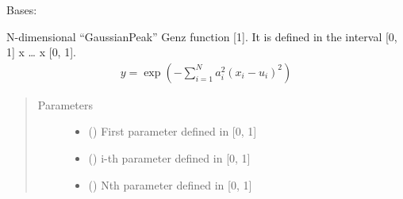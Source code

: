 \documentclass[letterpaper,10pt,english,openany,oneside]{sphinxmanual}
\begin{document}

\begin{fulllineitems}
\label{\detokenize{pygpc.testfunctions:pygpc.testfunctions.testfunctions.GenzGaussianPeak}}
Bases: {\hyperref[\detokenize{pygpc:pygpc.AbstractModel.AbstractModel}]{}}

N-dimensional “GaussianPeak” Genz function {[}1{]}. It is defined in the interval {[}0, 1{]} x … x {[}0, 1{]}.
\begin{equation*}
\begin{split}y = \exp\left( - \sum_{i=1}^{N} a_i ^2 (x_i - u_i)^2\right)\end{split}
\end{equation*}\begin{quote}\begin{description}
\item[{Parameters}] \leavevmode\begin{itemize}
\item {} 
\sphinxstyleliteralstrong{\sphinxupquote{{[}}}\sphinxstyleliteralstrong{\sphinxupquote{{]}}} (\sphinxstyleliteralemphasis{\sphinxupquote{ {[}}}\sphinxstyleliteralemphasis{\sphinxupquote{{]}}}) \textendash{} First parameter defined in {[}0, 1{]}

\item {} 
\sphinxstyleliteralstrong{\sphinxupquote{{[}}}\sphinxstyleliteralstrong{\sphinxupquote{{]}}} (\sphinxstyleliteralemphasis{\sphinxupquote{ {[}}}\sphinxstyleliteralemphasis{\sphinxupquote{{]}}}) \textendash{} i-th parameter defined in {[}0, 1{]}

\item {} 
\sphinxstyleliteralstrong{\sphinxupquote{{[}}}\sphinxstyleliteralstrong{\sphinxupquote{{]}}} (\sphinxstyleliteralemphasis{\sphinxupquote{ {[}}}\sphinxstyleliteralemphasis{\sphinxupquote{{]}}}) \textendash{} Nth parameter defined in {[}0, 1{]}


\end{itemize}
\end{description}
\end{quote}
\end{fulllineitems}
\end{document}
